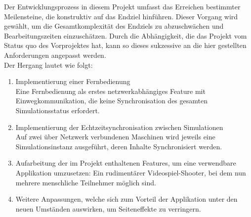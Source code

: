 \label{sec:proceedings}

Der Entwicklungsprozess in diesem Projekt umfasst das Erreichen bestimmter Meilensteine, die konstruktiv auf das Endziel hinführen. Dieser Vorgang wird gewählt, um die Gesamtkomplexität des Endziels zu abzuschwächen und Bearbeitungszeiten einzuschätzen. Durch die Abhängigkeit, die das Projekt vom Status quo des Vorprojektes hat, kann so dieses sukzessive an die hier gestellten Anforderungen angepasst werden.\\
Der Hergang lautet wie folgt:
\begin{enumerate}
\item Implementierung einer Fernbedienung\\
Eine Fernbedienung als erstes netzwerkabhängiges Feature mit Einwegkommunikation, die keine Synchronisation des gesamten Simulationsstatus erfordert.
\item Implementierung der Echtzeitsynchronisation zwischen Simulationen\\
Auf zwei über Netzwerk verbundenen Maschinen wird jeweils eine Simulationsinstanz ausgeführt, deren Inhalte Synchronisiert werden.
\item Aufarbeitung der im Projekt enthaltenen Features, um eine verwendbare Applikation umzusetzen: Ein rudimentärer Videospiel-Shooter, bei dem nun mehrere menschliche Teilnehmer möglich sind.
\item Weitere Anpassungen, welche sich zum Vorteil der Applikation unter den neuen Umständen auswirken, um Seiteneffekte zu verringern.
\end{enumerate}

